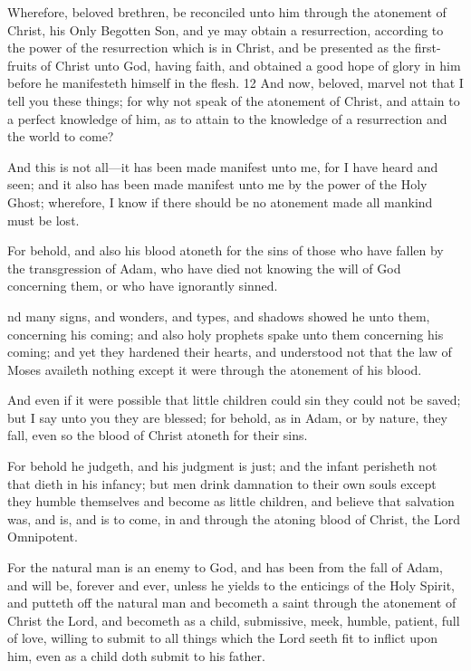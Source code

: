 \begin{compactdesc}
			\item[Jacob 4:11--12] Wherefore, beloved brethren, be reconciled unto him through the atonement of Christ, his Only Begotten Son, and ye may obtain a resurrection, according to the power of the resurrection which is in Christ, and be presented as the first-fruits of Christ unto God, having faith, and obtained a good hope of glory in him before he manifesteth himself in the flesh. 12 And now, beloved, marvel not that I tell you these things; for why not speak of the atonement of Christ, and attain to a perfect knowledge of him, as to attain to the knowledge of a resurrection and the world to come?
			\item[Jacob 7:12] And this is not all---it has been made manifest unto me, for I have heard and seen; and it also has been made manifest unto me by the power of the Holy Ghost; wherefore, I know if there should be no atonement made all mankind must be lost.
			\item[Mosiah 3:11] For behold, and also his blood atoneth for the sins of those who have fallen by the transgression of Adam, who have died not knowing the will of God concerning them, or who have ignorantly sinned.
			\item[Mosiah 3:15] nd many signs, and wonders, and types, and shadows showed he unto them, concerning his coming; and also holy prophets spake unto them concerning his coming; and yet they hardened their hearts, and understood not that the law of Moses availeth nothing except it were through the atonement of his blood.
			\item[Mosiah 3:16] And even if it were possible that little children could sin they could not be saved; but I say unto you they are blessed; for behold, as in Adam, or by nature, they fall, even so the blood of Christ atoneth for their sins.
			\item[Mosiah 3:18] For behold he judgeth, and his judgment is just; and the infant perisheth not that dieth in his infancy; but men drink damnation to their own souls except they humble themselves and become as little children, and believe that salvation was, and is, and is to come, in and through the atoning blood of Christ, the Lord Omnipotent.
			\item[Mosiah 3:19] For the natural man is an enemy to God, and has been from the fall of Adam, and will be, forever and ever, unless he yields to the enticings of the Holy Spirit, and putteth off the natural man and becometh a saint through the atonement of Christ the Lord, and becometh as a child, submissive, meek, humble, patient, full of love, willing to submit to all things which the Lord seeth fit to inflict upon him, even as a child doth submit to his father.

\end{compactdesc}
